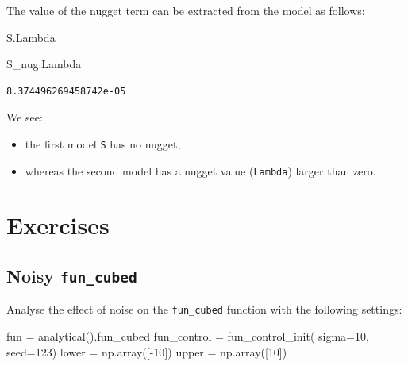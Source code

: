 \documentclass[
  letterpaper,
  DIV=11,
  numbers=noendperiod]{scrreprt}
\newenvironment{Shaded}{\begin{snugshade}}{\end{snugshade}}
\newcommand{\DecValTok}[1]{\textcolor[rgb]{0.68,0.00,0.00}{#1}}
\newcommand{\NormalTok}[1]{\textcolor[rgb]{0.00,0.23,0.31}{#1}}
\newcommand{\OperatorTok}[1]{\textcolor[rgb]{0.37,0.37,0.37}{#1}}
\providecommand{\tightlist}{%
  \setlength{\itemsep}{0pt}\setlength{\parskip}{0pt}}\usepackage{longtable,booktabs,array}
\begin{document}
The value of the nugget term can be extracted from the model as follows:

\begin{Shaded}
\begin{Highlighting}[]
\NormalTok{S.Lambda}
\end{Highlighting}
\end{Shaded}

\begin{Shaded}
\begin{Highlighting}[]
\NormalTok{S\_nug.Lambda}
\end{Highlighting}
\end{Shaded}

\begin{verbatim}
8.374496269458742e-05
\end{verbatim}

We see:

\begin{itemize}
\tightlist
\item
  the first model \texttt{S} has no nugget,
\item
  whereas the second model has a nugget value (\texttt{Lambda}) larger
  than zero.
\end{itemize}

\section{Exercises}\label{exercises-7}

\subsection{\texorpdfstring{Noisy
\texttt{fun\_cubed}}{Noisy fun\_cubed}}\label{noisy-fun_cubed-1}

Analyse the effect of noise on the \texttt{fun\_cubed} function with the
following settings:

\begin{Shaded}
\begin{Highlighting}[]
\NormalTok{fun }\OperatorTok{=}\NormalTok{ analytical().fun\_cubed}
\NormalTok{fun\_control }\OperatorTok{=}\NormalTok{ fun\_control\_init(    }
\NormalTok{    sigma}\OperatorTok{=}\DecValTok{10}\NormalTok{,}
\NormalTok{    seed}\OperatorTok{=}\DecValTok{123}\NormalTok{)}
\NormalTok{lower }\OperatorTok{=}\NormalTok{ np.array([}\OperatorTok{{-}}\DecValTok{10}\NormalTok{])}
\NormalTok{upper }\OperatorTok{=}\NormalTok{ np.array([}\DecValTok{10}\NormalTok{])}
\end{Highlighting}
\end{Shaded}
\end{document}
